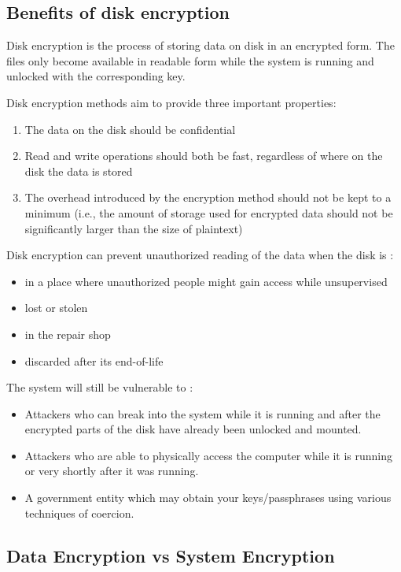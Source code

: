 \subsection{Benefits of disk encryption}
\label{sub-sec:benefits-enc}

Disk encryption is the process of storing data on disk in an encrypted form. The files only become available in readable form while the system is running and unlocked with the corresponding key.

Disk encryption methods aim to provide three important properties:
\begin{enumerate}
\item The data on the disk should be confidential
\item Read and write operations should both be fast, regardless of where on the disk the data is stored
\item The overhead introduced by the encryption method should not be kept to a minimum (i.e., the amount of storage used for encrypted data should not be significantly larger than the size of plaintext)
\end{enumerate}

Disk encryption can prevent unauthorized reading of the data when the disk is
\cite{disk-enc}:
\begin{itemize}
\item in a place where unauthorized people might gain access while unsupervised
\item lost or stolen
\item in the repair shop
\item discarded after its end-of-life
\end{itemize}

The system will still be vulnerable to
\cite{disk-enc}:
\begin{itemize}
\item Attackers who can break into the system while it is running and after the encrypted parts of the disk have already been unlocked and mounted.
\item Attackers who are able to physically access the computer while it is running or very shortly after it was running.
\item A government entity which may obtain your keys/passphrases using various techniques of coercion.
\end{itemize}

\subsection{Data Encryption vs System Encryption}
\label{sub-sec:de-vs-se}

